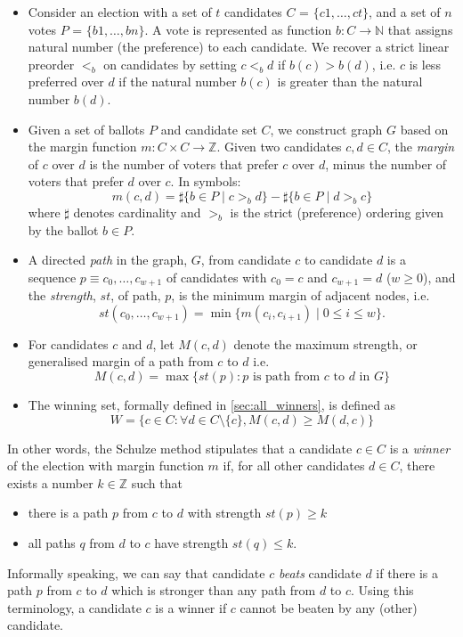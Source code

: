 \begin{itemize}

\item Consider an election with a set of $t$ candidates
 $C$ = $\{c1,\dots,ct\}$, and 
	a set of $n$ votes $P$ = $\{b1,\dots,bn\}$. A vote
	is represented as function $b: C \rightarrow \mathbb{N}$ that 
	assigns natural 
	number (the preference) to each candidate. We recover a strict linear  
	preorder $<_b$ on candidates by setting $c <_b d$ if $b(c) > b(d)$, i.e. 
	$c$ is less preferred over $d$ if the natural number $b(c)$ is greater
	than the natural number $b(d)$. 
	
\item Given a set of ballots $P$ and candidate set $C$, we construct graph $G$ based on the margin function $m: C \times C \to \mathbb{Z}$. Given two candidates $c, d \in C$,
the \emph{margin} of $c$ over $d$ is
the number of voters that prefer $c$ over $d$, minus the number of voters that prefer $d$ over $c$. 
In symbols:
\[
  m(c, d) = \sharp \lbrace b \in P \mid c >_b d \rbrace -
            \sharp \lbrace b \in P \mid d >_b c \rbrace
\] where $\sharp$ denotes cardinality and $>_b$ is the strict
(preference) ordering given by the ballot $b \in P$.





\item A directed \emph{path} in the graph, $G$, from
candidate $c$ to candidate $d$ is a sequence $p \equiv c_0, \dots, c_{w+1}$
of candidates with $c_0 = c$ and $c_{w+1} = d$ ($w \geq 0$), and the
\emph{strength}, $st$, of path, $p$, is the minimum margin of adjacent
nodes, i.e.
\[ st(c_0, \dots, c_{w+1}) = \min \lbrace m (c_i, c_{i+1}) \mid 0
\leq i \leq w \rbrace. \]
\item For candidates $c$ and $d$, let $M(c, d)$ denote the maximum strength, or generalised margin of a path
	from $c$ to $d$ i.e. 
	\[ M(c, d) = \max \lbrace st (p) : p \text{ is path from } c \text{ to } d \text{ in } G \rbrace\]
	
\item The winning set, formally defined in \ref{sec:all_winners},  is defined as 
 \[ W =  \lbrace c \in C : \forall d \in C \setminus \{c\}, M (c, d) \geq M (d, c) \rbrace\]

\end{itemize}

In other words, the Schulze method
stipulates that a candidate $c \in C$ is a \emph{winner} of the
election with margin function $m$ if, for all other candidates $d \in
C$, there exists a number $k \in \mathbb{Z}$ such that
\begin{itemize}
\item there is a path $p$ from $c$ to $d$ with strength $st(p) \geq k$
\item all paths $q$ from $d$ to $c$ have strength $st(q) \leq k$.
\end{itemize}
Informally speaking, we can say that  candidate $c$
\emph{beats} candidate $d$ if there is a path $p$ from
$c$ to $d$ which is stronger than any path from $d$ to $c$. Using
this terminology, a candidate $c$ is a winner if $c$ cannot be
beaten by any (other) candidate.


